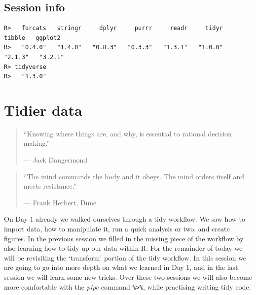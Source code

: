\documentclass[
]{book}
\newenvironment{Shaded}{\begin{snugshade}}{\end{snugshade}}
\newcommand{\KeywordTok}[1]{\textcolor[rgb]{0.13,0.29,0.53}{\textbf{#1}}}
\newcommand{\NormalTok}[1]{#1}
\newcommand{\OperatorTok}[1]{\textcolor[rgb]{0.81,0.36,0.00}{\textbf{#1}}}
\newcommand{\StringTok}[1]{\textcolor[rgb]{0.31,0.60,0.02}{#1}}
\begin{document}
\hypertarget{session-info-9}{%
\section{Session info}\label{session-info-9}}

\begin{Shaded}
\end{Shaded}

\begin{verbatim}
R>   forcats   stringr     dplyr     purrr     readr     tidyr    tibble   ggplot2 
R>   "0.4.0"   "1.4.0"   "0.8.3"   "0.3.3"   "1.3.1"   "1.0.0"   "2.1.3"   "3.2.1" 
R> tidyverse 
R>   "1.3.0"
\end{verbatim}

\hypertarget{tidier}{%
\chapter{Tidier data}\label{tidier}}

\begin{quote}
``Knowing where things are, and why, is essential to rational decision making.''

--- Jack Dangermond
\end{quote}

\begin{quote}
``The mind commands the body and it obeys. The mind orders itself and meets resistance.''

--- Frank Herbert, Dune
\end{quote}

On Day 1 already we walked ourselves through a tidy workflow. We saw how to import data, how to manipulate it, run a quick analysis or two, and create figures. In the previous session we filled in the missing piece of the workflow by also learning how to tidy up our data within R. For the remainder of today we will be revisiting the `transform' portion of the tidy workflow. In this session we are going to go into more depth on what we learned in Day 1, and in the last session we will learn some new tricks. Over these two sessions we will also become more comfortable with the \emph{pipe} command \texttt{\%\textgreater{}\%}, while practising writing tidy code.
\end{document}
